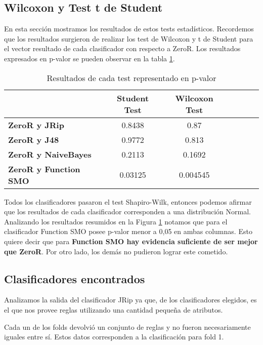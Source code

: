 \subsection{Wilcoxon y Test t de Student}

En esta sección mostramos los resultados de estos tests estadísticos. Recordemos que los resultados surgieron de realizar los test de Wilcoxon y t de Student para el vector resultado de cada clasificador con respecto a ZeroR. Los resultados expresados en p-valor se pueden observar en la tabla \ref{res_tests_wilcoxon_student}.

\begin{table}[H]
	\centering
	\begin{tabular}{|l|c|c|c|c|c|c|}
		\hline
		\textbf{}  & \textbf{Student Test} & \textbf{Wilcoxon Test} \\ \hline
		\textbf{ZeroR y JRip}  & 0.8438 & 0.87 \\ \hline
		\textbf{ZeroR y J48}  & 0.9772 & 0.813 \\ \hline
		\textbf{ZeroR y NaiveBayes}  & 0.2113 & 0.1692 \\ \hline
		\textbf{ZeroR y Function SMO}  & 0.03125 & 0.004545 \\ \hline
	\end{tabular}
	\caption{Resultados de cada test representado en p-valor}
	\label{res_tests_wilcoxon_student}
\end{table}

Todos los clasificadores pasaron el test Shapiro-Wilk, entonces podemos afirmar que los resultados de cada clasificador corresponden a una distribución Normal. Analizando los resultados resumidos en la Figura \ref{res_tests_wilcoxon_student} notamos que para el clasificador Function SMO posee p-valor menor a 0,05 en ambas columnas. Esto quiere decir que para \textbf{Function SMO hay evidencia suficiente de ser mejor que ZeroR}. Por otro lado, los demás no pudieron lograr este cometido. 

\subsection{Clasificadores encontrados}

Analizamos la salida del clasificador JRip ya que, de los clasificadores elegidos, es el que nos provee reglas utilizando una cantidad pequeña de atributos.

Cada un de los folds devolvió un conjunto de reglas y no fueron necesariamente iguales entre sí. Estos datos corresponden a la clasificación para fold 1.

